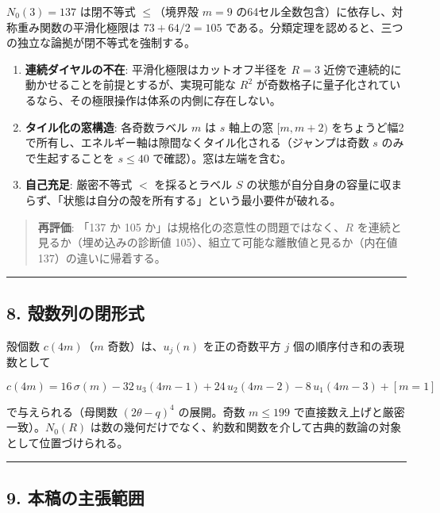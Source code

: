 \documentclass[
]{ltjsarticle}
\providecommand{\tightlist}{%
  \setlength{\itemsep}{0pt}\setlength{\parskip}{0pt}}
\begin{document}
\(N_0(3)=137\) は閉不等式 \(\le\)（境界殻 \(m=9\)
の64セル全数包含）に依存し、対称重み関数の平滑化極限は \(73+64/2=105\)
である。分類定理を認めると、三つの独立な論拠が閉不等式を強制する。

\begin{enumerate}
\def\labelenumi{\arabic{enumi}.}
\tightlist
\item
  \textbf{連続ダイヤルの不在}: 平滑化極限はカットオフ半径を \(R=3\)
  近傍で連続的に動かせることを前提とするが、実現可能な \(R^2\)
  が奇数格子に量子化されているなら、その極限操作は体系の内側に存在しない。
\item
  \textbf{タイル化の窓構造}: 各奇数ラベル \(m\) は \(s\) 軸上の窓
  \([m,m+2)\)
  をちょうど幅2で所有し、エネルギー軸は隙間なくタイル化される（ジャンプは奇数
  \(s\) のみで生起することを \(s\le40\) で確認）。窓は左端を含む。
\item
  \textbf{自己充足}: 厳密不等式 \(<\) を採るとラベル \(S\)
  の状態が自分自身の容量に収まらず、「状態は自分の殻を所有する」という最小要件が破れる。
\end{enumerate}

\begin{quote}
\textbf{再評価}: 「137 か 105 か」は規格化の恣意性の問題ではなく、\(R\)
を連続と見るか（埋め込みの診断値
105）、組立て可能な離散値と見るか（内在値 137）の違いに帰着する。
\end{quote}

\begin{center}\rule{0.5\linewidth}{0.5pt}\end{center}

\subsection{8.
殻数列の閉形式}\label{ux6bbbux6570ux5217ux306eux9589ux5f62ux5f0f}

殻個数 \(c(4m)\)（\(m\) 奇数）は、\(u_j(n)\) を正の奇数平方 \(j\)
個の順序付き和の表現数として

\[
c(4m) = 16\,\sigma(m) - 32\,u_3(4m-1) + 24\,u_2(4m-2) - 8\,u_1(4m-3) + [m{=}1]
\]

で与えられる（母関数 \((2\theta-q)^4\) の展開。奇数 \(m\le199\)
で直接数え上げと厳密一致）。\(N_0(R)\)
は数の幾何だけでなく、約数和関数を介して古典的数論の対象として位置づけられる。

\begin{center}\rule{0.5\linewidth}{0.5pt}\end{center}

\subsection{9.
本稿の主張範囲}\label{ux672cux7a3fux306eux4e3bux5f35ux7bc4ux56f2}
\end{document}
